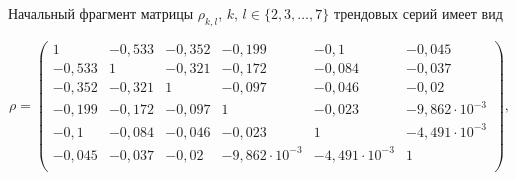 Начальный фрагмент матрицы $\rho _{k,l}$, $k$, $l\in \{2, 3, \ldots, 7\}$ трендовых серий имеет вид

$$ 

\rho =

\begin{pmatrix}

1& -0,533 & -0,352 & -0,199  & -0,1 & -0,045 \\

-0,533  & 1 & -0,321 & -0,172 & -0,084 & -0,037  \\

-0,352 & -0,321 & 1 & -0,097 & -0,046 & -0,02 \\

-0,199 & -0,172 & -0,097 & 1 & -0,023 & -9,862\cdot 10^{-3} \\

-0,1 & -0,084 & -0,046 & -0,023 & 1 & -4,491 \cdot 10^{-3} \\

-0,045 & -0,037 & -0,02 & -9,862 \cdot 10^{-3} & -4,491\cdot 10^{-3} & 1 \\


\end{pmatrix},

$$

%

%



















